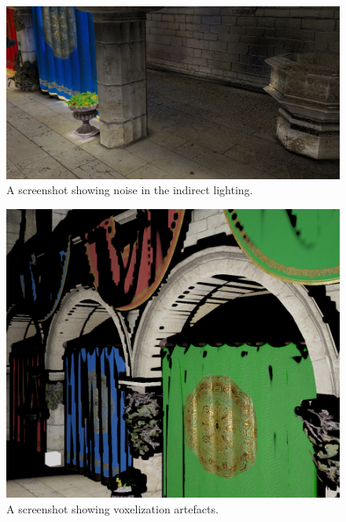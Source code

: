 \documentclass[]{acmsiggraph}
\begin{document}
\begin{figure}[htbp]\centering
 \includegraphics[width=1.0\linewidth]{images/indirect_noise.png}
 \caption{A screenshot showing noise in the indirect lighting.}
\end{figure}

\begin{figure}[htbp]\centering
 \includegraphics[width=1.0\linewidth]{images/voxelization_error.png}
 \caption{A screenshot showing voxelization artefacts.}
\end{figure}



\end{document}
